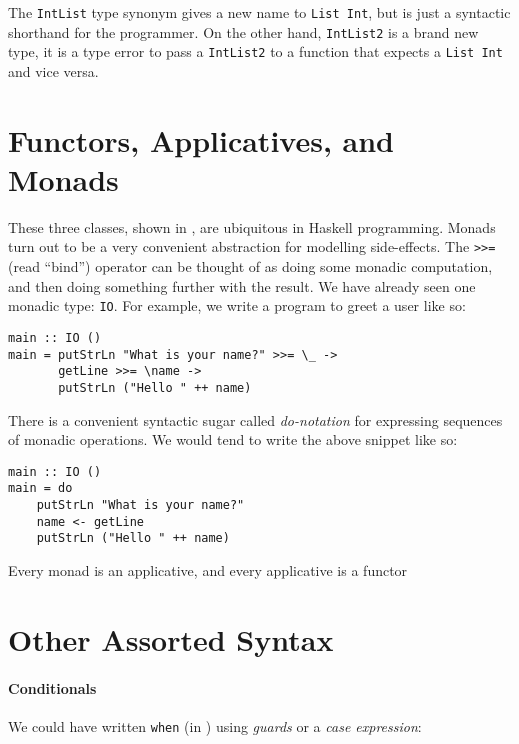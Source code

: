 \begin{figure}[b]
  \hrulefill
  \centering
  
  \label{fig:famonad}
\end{figure}

The \verb|IntList| type synonym gives a new name to \verb|List Int|, but is just
a syntactic shorthand for the programmer.  On the other hand, \verb|IntList2| is
a brand new type, it is a type error to pass a \verb|IntList2| to a function
that expects a \verb|List Int| and vice versa.

\section*{Functors, Applicatives, and Monads}

These three classes, shown in , are ubiquitous in Haskell
programming.  Monads turn out to be a very convenient abstraction for modelling
side-effects.  The \verb|>>=| (read ``bind'') operator can be thought of as
doing some monadic computation, and then doing something further with the
result.  We have already seen one monadic type: \verb|IO|.  For example, we
write a program to greet a user like so:

\begin{verbatim}
main :: IO ()
main = putStrLn "What is your name?" >>= \_ ->
       getLine >>= \name ->
       putStrLn ("Hello " ++ name)
\end{verbatim}

There is a convenient syntactic sugar called \emph{do-notation} for expressing
sequences of monadic operations.  We would tend to write the above snippet like
so:

\begin{verbatim}
main :: IO ()
main = do
    putStrLn "What is your name?"
    name <- getLine
    putStrLn ("Hello " ++ name)
\end{verbatim}

Every monad is an applicative, and every applicative is a functor

\section*{Other Assorted Syntax}

\paragraph{Conditionals}
We could have written \verb|when| (in ) using \emph{guards} or a
\emph{case expression}:

